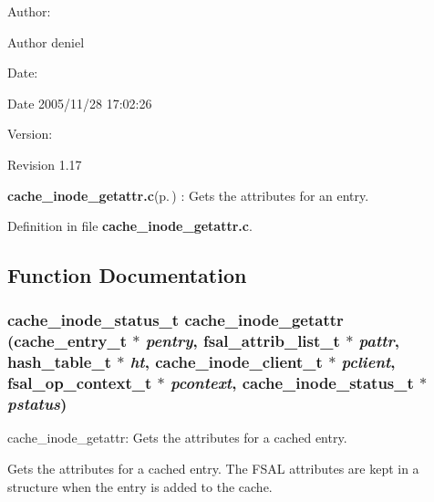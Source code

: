 \begin{Desc}
\item[Author:]\begin{Desc}
\item[Author]deniel \end{Desc}
\end{Desc}
\begin{Desc}
\item[Date:]\begin{Desc}
\item[Date]2005/11/28 17:02:26 \end{Desc}
\end{Desc}
\begin{Desc}
\item[Version:]\begin{Desc}
\item[Revision]1.17 \end{Desc}
\end{Desc}
{\bf cache\_\-inode\_\-getattr.c}{\rm (p.\,\pageref{cache__inode__getattr_8c})} : Gets the attributes for an entry.

Definition in file {\bf cache\_\-inode\_\-getattr.c}.

\subsection{Function Documentation}
\subsubsection{\setlength{\rightskip}{0pt plus 5cm}cache\_\-inode\_\-status\_\-t cache\_\-inode\_\-getattr (cache\_\-entry\_\-t $\ast$ {\em pentry}, fsal\_\-attrib\_\-list\_\-t $\ast$ {\em pattr}, hash\_\-table\_\-t $\ast$ {\em ht}, cache\_\-inode\_\-client\_\-t $\ast$ {\em pclient}, fsal\_\-op\_\-context\_\-t $\ast$ {\em pcontext}, cache\_\-inode\_\-status\_\-t $\ast$ {\em pstatus})}\label{cache__inode__getattr_8c_a0}


cache\_\-inode\_\-getattr: Gets the attributes for a cached entry.

Gets the attributes for a cached entry. The FSAL attributes are kept in a structure when the entry is added to the cache.

